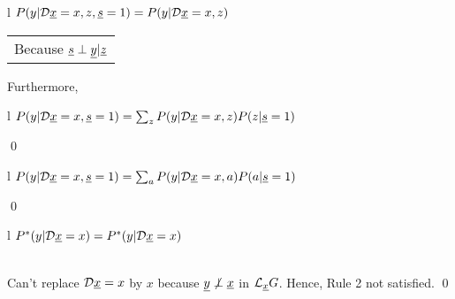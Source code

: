 \begin{claim}
\label{cl-decTransportDirect}
\decTransportDirect
\end{claim}
\proof
\begin{longtable}{l}
\color{red}
$P(y|{\cal D}{\underline{x}}=x, z, {\underline{s}}=1)=
P(y|{\cal D}{\underline{x}}=x, z)$
\\
\xymatrix{\\=}
\begin{tabular}{l}
Because ${\underline{s}}\perp{\underline{y}}|{\underline{z}}$
\end{tabular}
\end{longtable}
Furthermore,
\begin{longtable}{l}
\color{red}
$P(y|{\cal D} {\underline{x}}=x, {\underline{s}}=1)
=\sum_z P(y|{\cal D}{\underline{x}}=x,z)P(z|{\underline{s}}=1)$
\\
\end{longtable}
\qed

\begin{claim}
\label{cl-decTransportBox}
\decTransportBox
\end{claim}
\proof
\begin{longtable}{l}
\color{red}$
P(y|{\cal D}{\underline{x}}=x, {\underline{s}}=1)
=\sum_{a}
P(y|{\cal D}{\underline{x}}=x,a)P(a|{\underline{s}}=1)$
\\
\xymatrix{\\=}
\end{longtable}
\qed


\begin{claim}
\label{cl-decTransportNon}
\decTransportNon
\end{claim}
\proof
\begin{longtable}{l}
\color{red}
$P^*(y|{\cal D}{\underline{x}}=x)=P^*(y|{\cal D}{\underline{x}}=x)$
\\
\\
\xymatrix{\\=}
\end{longtable}
Can't replace ${\cal D}{\underline{x}}=x$ 
by $x$ because 
${\underline{y}}\not\perp {\underline{x}}$ in 
${\cal L}_{\underline{x}} G$.
Hence, Rule 2 not satisfied.
\qed



